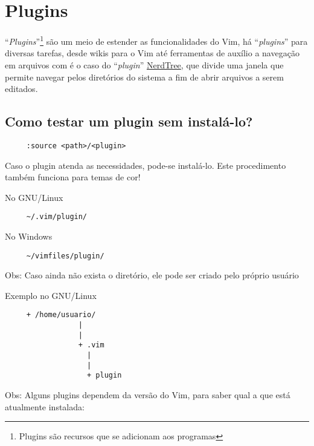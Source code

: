 
\chapter{Plugins}\label{Plugins}

``{\em Plugins}''\footnote{Plugins são recursos que se adicionam aos programas}
são um meio de estender as funcionalidades do Vim, há ``{\em plugins}'' para
diversas tarefas, desde wikis para o Vim até ferramentas de auxílio a navegação
em arquivos com é o caso do ``{\em plugin}''
\href{http://www.vim.org/scripts/script.php?script\_id=1658}{NerdTree}, que
divide uma janela que permite navegar pelos diretórios do sistema a fim de
abrir arquivos a serem editados.

\section{Como testar um plugin sem instalá-lo?}
\label{Como testar um plugin sem instala-lo?}

\begin{verbatim}
     :source <path>/<plugin>
\end{verbatim}

Caso o plugin atenda as necessidades, pode-se instalá-lo. Este
procedimento também funciona para temas de cor!


No GNU/Linux
\begin{verbatim}
     ~/.vim/plugin/
\end{verbatim}

No Windows

\begin{verbatim}
     ~/vimfiles/plugin/
\end{verbatim}

Obs: Caso ainda não exista o diretório, ele pode ser criado pelo próprio usuário

Exemplo no GNU/Linux

\begin{verbatim}
     + /home/usuario/
                 |
                 |
                 + .vim
                   |
                   |
                   + plugin
\end{verbatim}

Obs: Alguns plugins dependem da versão do Vim, para saber qual
a que está atualmente instalada:

